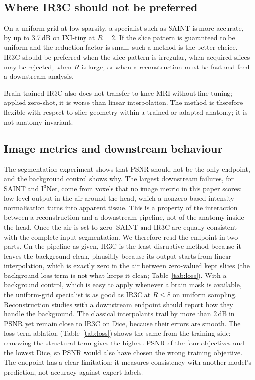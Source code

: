 \documentclass[a4paper,fleqn]{cas-dc}
\newcommand{\Ithree}{I$^3$Net\xspace}
\begin{document}
\subsection{Where IR3C should not be preferred}

On a uniform grid at low sparsity, a specialist such as SAINT is more accurate, by up to
3.7\,dB on IXI-tiny at $R=2$. If the slice pattern is guaranteed to be uniform and the
reduction factor is small, such a method is the better choice. IR3C should be preferred when
the slice pattern is irregular, when acquired slices may be rejected, when $R$ is large, or
when a reconstruction must be fast and feed a downstream analysis.

Brain-trained IR3C also does not transfer to knee MRI without fine-tuning; applied zero-shot,
it is worse than linear interpolation. The method is therefore flexible with respect to slice
geometry within a trained or adapted anatomy; it is not anatomy-invariant.

\subsection{Image metrics and downstream behaviour}
\label{sec:disc-metrics}

The segmentation experiment shows that PSNR should not be the only endpoint, and the
background control shows why. The largest downstream failures, for SAINT and \Ithree, come
from voxels that no image metric in this paper scores: low-level output in the air around
the head, which a nonzero-based intensity normalisation turns into apparent tissue. This is
a property of the interaction between a reconstruction and a downstream pipeline, not of the
anatomy inside the head. Once the air is set to zero, SAINT and IR3C are equally consistent
with the complete-input segmentation. We therefore read the endpoint in two parts. On the
pipeline as given, IR3C is the least disruptive method because it leaves the background
clean, plausibly because its output starts from linear interpolation, which is exactly
zero in the air between zero-valued kept slices (the background loss term is not what keeps
it clean; Table~\ref{tab:loss}). With a background control, which is easy to apply
whenever a brain mask is available, the uniform-grid specialist is as good as IR3C at
$R\le8$ on uniform sampling. Reconstruction studies with a downstream endpoint should report
how they handle the background. The classical interpolants trail by more than 2\,dB in PSNR
yet remain close to IR3C on Dice, because their errors are smooth. The loss-term ablation (Table~\ref{tab:loss}) shows the
same from the training side: removing the structural term gives the highest PSNR of the
four objectives and the lowest Dice, so PSNR would also have chosen the wrong training
objective. The endpoint has a clear limitation: it measures
consistency with another model's prediction, not accuracy against expert labels.
\end{document}
